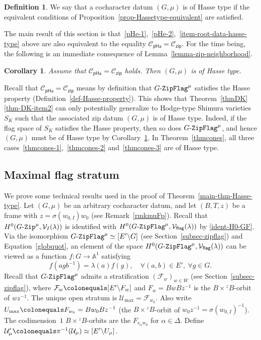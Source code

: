 \documentclass[11pt]{amsart}
\numberwithin{equation}{section}
\newtheorem{corollary}[theorem]{Corollary}
\theoremstyle{definition}
\newtheorem{definition}[theorem]{Definition}
\theoremstyle{remark}
\newcommand{\GZip}{\mathop{\text{$G$-{\tt Zip}}}\nolimits}
\newcommand{\pha}{\mathsf{pHa}}
\newcommand{\zipsf}{\mathsf{zip}}
\newcommand{\flag}{\mathsf{flag}}
\newcommand{\GF}{\mathop{\text{$G$-{\tt ZipFlag}}}\nolimits}
\newcommand{\Ccal}{{\mathcal C}}
\newcommand{\Fcal}{{\mathcal F}}
\newcommand{\Ucal}{{\mathcal U}}
\newcommand{\Vcal}{{\mathcal V}}
\renewcommand{\AA}{\mathbb{A}}
\begin{document}
\begin{definition}\label{def-Hasse-type-cochardatum}
We say that a cocharacter datum $(G,\mu)$ is of Hasse type if the equivalent conditions of Proposition~\ref{prop-Hassetype-equivalent} are satisfied.
\end{definition}

The main result of this section is that~\eqref{pHe-1},~\eqref{pHe-2},~\eqref{item-root-data-hasse-type} above are also equivalent to the equality $\Ccal_{\pha}=\Ccal_{\zipsf}$. For the time being, the following is an immediate consequence of Lemma~\ref{lemma-zip-neighborhood}. 

\begin{corollary}\label{cor-Hassetype}
Assume that $\Ccal_{\pha} = \Ccal_{\zipsf}$ holds. Then $(G,\mu)$ is of Hasse type.
\end{corollary}

Recall that $\Ccal_{\pha} = \Ccal_{\zipsf}$ means by definition that $\GF^{\mu}$ satisfies the Hasse property (Definition~\ref{def-Hasse-property}). This shows that Theorem~\ref{thmDK}\eqref{thm-DK-item2} can only potentially generalize to Hodge-type Shimura varieties $S_K$ such that the associated zip datum $(G,\mu)$ is of Hasse type. Indeed, if the flag space of $S_K$ satisfies the Hasse property, then so does $\GF^{\mu}$, and hence $(G,\mu)$ must be of Hasse type by Corollary~\ref{cor-Hassetype}. In Theorem~\ref{thmcones}, all three cases~\eqref{thmcones-1},~\eqref{thmcones-2} and~\eqref{thmcones-3} are of Hasse type.




\subsection{Maximal flag stratum}\label{sec-max-flag-stratum}

We prove some technical results used in the proof of Theorem~\ref{main-thm-Hasse-type}. Let $(G,\mu)$ be an arbitrary cocharacter datum, and let $(B,T,z)$ be a frame with $z=\sigma(w_{0,I}) w_0$ (see Remark~\ref{rmkmuFp}). Recall that $H^0(\GZip^\mu,\Vcal_I(\lambda))$ is identified with $H^0(\GF^{\mu},\Vcal_{\flag}(\lambda))$ by \eqref{ident-H0-GF}. Via the isomorphism $\GF^{\mu} \simeq [E'\backslash G]$ (see Section~\ref{subsec-zipflag}) and Equation~\eqref{globquot}, an element of the space $H^0(\GF^{\mu},\Vcal_{\flag}(\lambda))$ can be viewed as a function $f\colon G\to \AA^1$ satisfying
\begin{equation}\label{equ-Gzipflag-lambda}
    f(agb^{-1})=\lambda(a) f(g), \quad \forall (a,b)\in E', \ \forall g\in G.
\end{equation}
Recall that $\GF^{\mu}$ admits a stratification $(\Fcal_w)_{w\in W}$ (see Section~\ref{subsec-zipflag}), where $\Fcal_w\colonequals [E'\backslash F_w]$ and $F_w=BwBz^{-1}$ is the $B\times {}^z B$-orbit of $wz^{-1}$. The unique open stratum is $\Ucal_{\max}=\Fcal_{w_0}$. Also write  $U_{\max}\colonequals F_{w_0}=B w_0 Bz^{-1}$ (the $B\times {}^z B$-orbit of $w_0 z^{-1}=\sigma(w_{0,I})^{-1}$). The codimension~$1$ $B\times {}^z B$-orbits are the $F_{s_\alpha w_0}$ for $\alpha \in \Delta$. Define $\Ucal'_\mu\colonequals \pi^{-1}(\Ucal_\mu)\simeq [E'\backslash U_\mu]$.
\end{document}
